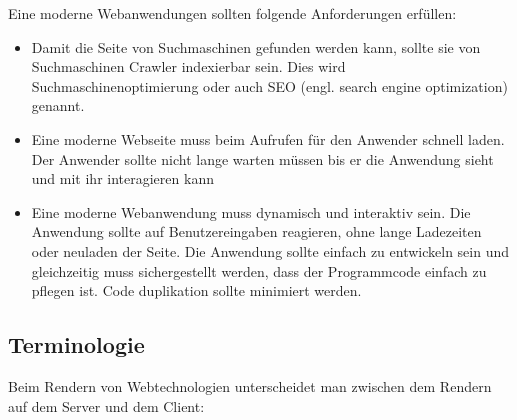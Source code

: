 \documentclass[runningheads]{llncs}
\begin{document}
Eine moderne Webanwendungen sollten folgende Anforderungen erfüllen\cite{IsomorphicApps}:
\begin{itemize}
  \setlength\itemsep{1em}
  \item Damit die Seite von Suchmaschinen gefunden werden kann, sollte sie von Suchmaschinen Crawler indexierbar sein. 
  Dies wird Suchmaschinenoptimierung oder auch SEO 
  (engl. search engine optimization) genannt. 
  \item Eine moderne Webseite muss beim Aufrufen für den Anwender schnell laden. Der Anwender sollte nicht lange warten 
  müssen bis er die Anwendung sieht und mit ihr interagieren kann
  \item Eine moderne Webanwendung muss dynamisch und interaktiv sein. Die Anwendung sollte auf Benutzereingaben reagieren, 
  ohne lange Ladezeiten oder neuladen der Seite.
  Die Anwendung sollte einfach zu entwickeln sein und gleichzeitig muss sichergestellt werden, 
  dass der Programmcode einfach zu pflegen ist. 
  Code duplikation sollte minimiert werden.
\end{itemize}

\subsection{Terminologie}
\label{subsec:Terminologie}
Beim Rendern von Webtechnologien unterscheidet man zwischen dem Rendern auf dem Server und dem Client:
\end{document}

